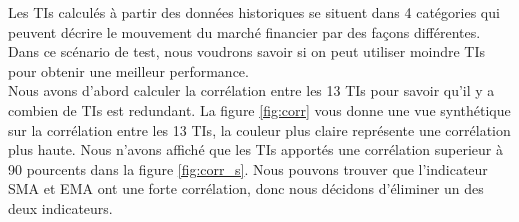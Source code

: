 Les TIs calculés à partir des données historiques se situent dans 4 catégories qui peuvent décrire le mouvement du marché financier par des façons différentes. Dans ce scénario de test, nous voudrons savoir si on peut utiliser moindre TIs pour obtenir une meilleur performance. \\

Nous avons d'abord calculer la corrélation entre les 13 TIs pour savoir qu'il y a combien de TIs est redundant. La figure \ref{fig:corr} vous donne une vue synthétique sur la corrélation entre les 13 TIs, la couleur plus claire représente une corrélation plus haute. Nous n'avons affiché que les TIs apportés une corrélation superieur à 90 pourcents dans la figure \ref{fig:corr_s}. Nous pouvons trouver que l'indicateur SMA et EMA ont une forte corrélation, donc nous décidons d'éliminer un des deux indicateurs. \\

